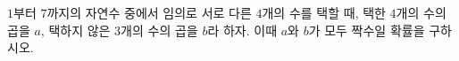 $1$부터 $7$까지의 자연수 중에서 임의로 서로 다른 $4$개의 수를 택할 때, 택한 $4$개의 수의 곱을 $a$, 택하지 않은 $3$개의 수의 곱을 $b$라 하자. 이때 $a$와 $b$가 모두 짝수일 확률을 구하시오.
